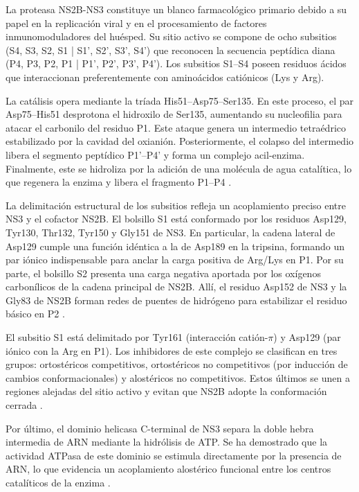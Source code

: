 La proteasa NS2B-NS3 constituye un blanco farmacológico primario debido a su papel en la replicación viral y en el procesamiento de factores inmunomoduladores del huésped. Su sitio activo se compone de ocho subsitios (S4, S3, S2, S1 | S1', S2', S3', S4') que reconocen la secuencia peptídica diana (P4, P3, P2, P1 | P1', P2', P3', P4'). Los subsitios S1–S4 poseen residuos ácidos que interaccionan preferentemente con aminoácidos catiónicos (Lys y Arg).

La catálisis opera mediante la tríada His51–Asp75–Ser135. En este proceso, el par Asp75–His51 desprotona el hidroxilo de Ser135, aumentando su nucleofilia para atacar el carbonilo del residuo P1. Este ataque genera un intermedio tetraédrico estabilizado por la cavidad del oxianión. Posteriormente, el colapso del intermedio libera el segmento peptídico P1'–P4' y forma un complejo acil-enzima. Finalmente, este se hidroliza por la adición de una molécula de agua catalítica, lo que regenera la enzima y libera el fragmento P1–P4  \cite{cavina2024orthoflaviviral}.

La delimitación estructural de los subsitios refleja un acoplamiento preciso entre NS3 y el cofactor NS2B. El bolsillo S1 está conformado por los residuos Asp129, Tyr130, Thr132, Tyr150 y Gly151 de NS3. En particular, la cadena lateral de Asp129 cumple una función idéntica a la de Asp189 en la tripsina, formando un par iónico indispensable para anclar la carga positiva de Arg/Lys en P1. Por su parte, el bolsillo S2 presenta una carga negativa aportada por los oxígenos carbonílicos de la cadena principal de NS2B. Allí, el residuo Asp152 de NS3 y la Gly83 de NS2B forman redes de puentes de hidrógeno para estabilizar el residuo básico en P2 \cite{li2020insights}.

El subsitio S1 está delimitado por Tyr161 (interacción catión-$\pi$) y Asp129 (par iónico con la Arg en P1). Los inhibidores de este complejo se clasifican en tres grupos: ortostéricos competitivos, ortostéricos no competitivos (por inducción de cambios conformacionales) y alostéricos no competitivos. Estos últimos se unen a regiones alejadas del sitio activo y evitan que NS2B adopte la conformación cerrada \cite{cavina2024orthoflaviviral}.

Por último, el dominio helicasa C-terminal de NS3 separa la doble hebra intermedia de ARN mediante la hidrólisis de ATP. Se ha demostrado que la actividad ATPasa de este dominio se estimula directamente por la presencia de ARN, lo que evidencia un acoplamiento alostérico funcional entre los centros catalíticos de la enzima \cite{lescar2008towards}.

